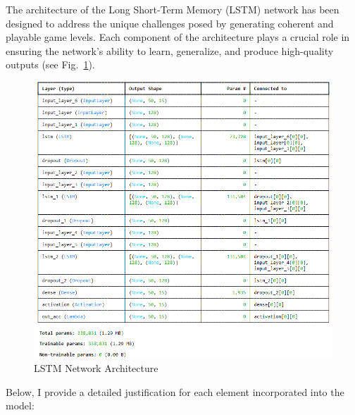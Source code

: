 \documentclass[runningheads]{llncs}
\begin{document}
The architecture of the Long Short-Term Memory (LSTM) network has been designed to address the unique challenges posed by generating coherent and playable game levels. Each component of the architecture plays a crucial role in ensuring the network's ability to learn, generalize, and produce high-quality outputs (see Fig.~\ref{fig1}).

\begin{figure}
\includegraphics[width=\textwidth]{lstm_architecutre.png}
\caption{LSTM Network Architecture} \label{fig1}
\end{figure}


Below, I provide a detailed justification for each element incorporated into the model:
\end{document}
